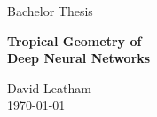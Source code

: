 \begin{titlepage}
	\begin{center}
		\vspace*{2.5cm}
		\begin{LARGE}
		Bachelor Thesis
		\end{LARGE}
		
		\vspace{0.3cm}
		\LARGE
		\textbf{Tropical Geometry of \\ Deep Neural Networks}
		
		\vspace{1cm}
		
		\large
		David Leatham \\
		\vspace{0.2cm}
		\large
		\today
		
	\end{center}
	
\end{titlepage}